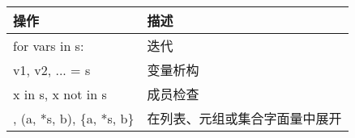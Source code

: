 \documentclass{article}
\begin{document}
\begin{table}[!ht]
    \centering
    \begin{tabular}{|l|l|}
        \hline
        操作                                   & 描述              \\ \hline
        for vars in s:                       & 迭代              \\ \hline
        v1, v2, ... = s                      & 变量析构            \\ \hline
        x in s, x not in s                   & 成员检查            \\ \hline
        [a, *s, b], (a, *s, b), \{a, *s, b\} & 在列表、元组或集合字面量中展开 \\ \hline
    \end{tabular}
\end{table}
\end{document}
